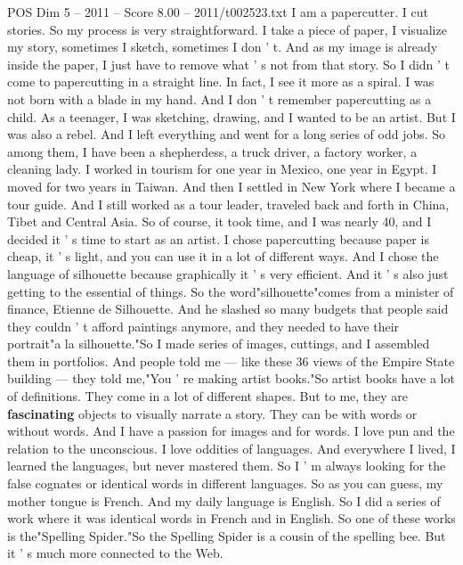 \begin{textsample}{POS Dim 5 – 2011 – Score 8.00 – 2011/t002523.txt}  \label{ex:f5_pos_031}
I am a papercutter.
I cut stories.
So my process is very straightforward.
I take a piece of paper, I visualize my story, sometimes I sketch, sometimes I don ' t.
And as my image is already inside the paper, I just have to remove what ' s not from that story.
So I didn ' t come to papercutting in a straight line.
In fact, I see it more as a spiral.
I was not born with a blade in my hand.
And I don ' t remember papercutting as a child.
As a teenager, I was sketching, drawing, and I wanted to be an artist.
But I was also a rebel.
And I left everything and went for a long series of odd jobs.
So among them, I have been a shepherdess, a truck driver, a factory worker, a cleaning lady.
I worked in tourism for one year in Mexico, one year in Egypt.
I moved for two years in Taiwan.
And then I settled in New York where I became a tour guide.
And I still worked as a tour leader, traveled back and forth in China, Tibet and Central Asia.
So of course, it took time, and I was nearly 40, and I decided it ' s time to start as an artist.
I chose papercutting because paper is cheap, it ' s light, and you can use it in a lot of different ways.
And I chose the language of silhouette because graphically it ' s very efficient.
And it ' s also just getting to the essential of things.
So the word"silhouette"comes from a minister of finance, Etienne de Silhouette.
And he slashed so many budgets that people said they couldn ' t afford paintings anymore, and they needed to have their portrait"a la silhouette."So I made series of images, cuttings, and I assembled them in portfolios.
And people told me — like these 36 views of the Empire State building — they told me,"You ' re making artist books."So artist books have a lot of definitions.
They come in a lot of different shapes.
But to me, they are \textbf{fascinating} objects to visually narrate a story.
They can be with words or without words.
And I have a passion for images and for words.
I love pun and the relation to the unconscious.
I love oddities of languages.
And everywhere I lived, I learned the languages, but never mastered them.
So I ' m always looking for the false cognates or identical words in different languages.
So as you can guess, my mother tongue is French.
And my daily language is English.
So I did a series of work where it was identical words in French and in English.
So one of these works is the"Spelling Spider."So the Spelling Spider is a cousin of the spelling bee.
But it ' s much more connected to the Web.

\end{textsample}
